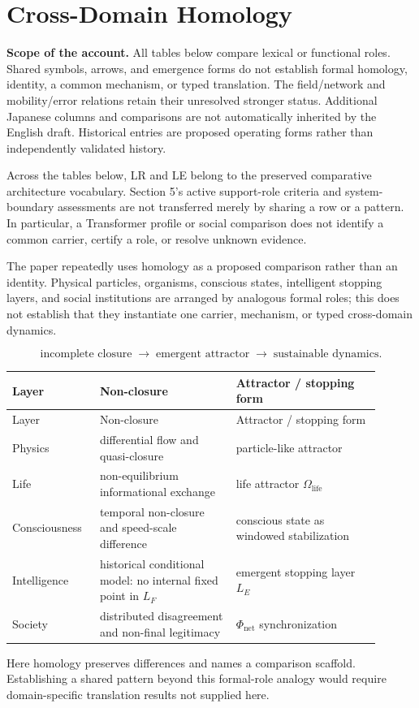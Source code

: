 \section{Cross-Domain Homology}

\noindent\textbf{Scope of the account.} All tables below compare lexical or functional roles. Shared symbols, arrows, and emergence forms do not establish formal homology, identity, a common mechanism, or typed translation. The field/network and mobility/error relations retain their unresolved stronger status. Additional Japanese columns and comparisons are not automatically inherited by the English draft. Historical entries are proposed operating forms rather than independently validated history.

Across the tables below, LR and LE belong to the preserved comparative architecture vocabulary. Section 5's active support-role criteria and system-boundary assessments are not transferred merely by sharing a row or a pattern. In particular, a Transformer profile or social comparison does not identify a common carrier, certify a role, or resolve unknown evidence.


The paper repeatedly uses homology as a proposed comparison rather than an identity. Physical particles, organisms, conscious states, intelligent stopping layers, and social institutions are arranged by analogous formal roles; this does not establish that they instantiate one carrier, mechanism, or typed cross-domain dynamics.

\[
\text{incomplete closure}
\;\longrightarrow\;
\text{emergent attractor}
\;\longrightarrow\;
\text{sustainable dynamics}.
\]

\begin{longtable}{@{}p{0.20\linewidth}p{0.34\linewidth}p{0.36\linewidth}@{}}
\toprule
Layer & Non-closure & Attractor / stopping form \\
\midrule
\endfirsthead
\toprule
Layer & Non-closure & Attractor / stopping form \\
\midrule
\endhead
Physics & differential flow and quasi-closure & particle-like attractor \\
Life & non-equilibrium informational exchange & life attractor $\Omega_{\text{life}}$ \\
Consciousness & temporal non-closure and speed-scale difference & conscious state as windowed stabilization \\
Intelligence & historical conditional model: no internal fixed point in $L_F$ & emergent stopping layer $L_E$ \\
Society & distributed disagreement and non-final legitimacy & $\Phi_{\text{net}}$ synchronization \\
\bottomrule
\end{longtable}

Here homology preserves differences and names a comparison scaffold. Establishing a shared pattern beyond this formal-role analogy would require domain-specific translation results not supplied here.

\bigskip
